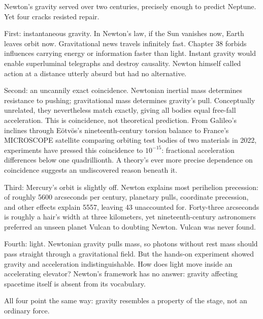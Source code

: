\begin{mainline}
Newton's gravity served over two centuries, precisely enough to predict Neptune. Yet four cracks resisted repair.

First: instantaneous gravity. In Newton's law, if the Sun vanishes now, Earth leaves orbit now. Gravitational news travels infinitely fast. Chapter 38 forbids influences carrying energy or information faster than light. Instant gravity would enable superluminal telegraphs and destroy causality. Newton himself called action at a distance utterly absurd but had no alternative.

Second: an uncannily exact coincidence. Newtonian inertial mass determines resistance to pushing; gravitational mass determines gravity's pull. Conceptually unrelated, they nevertheless match exactly, giving all bodies equal free-fall acceleration. This is coincidence, not theoretical prediction. From Galileo's inclines through Eötvös's nineteenth-century torsion balance to France's MICROSCOPE satellite comparing orbiting test bodies of two materials in 2022, experiments have pressed this coincidence to \(10^{-15}\): fractional acceleration differences below one quadrillionth. A theory's ever more precise dependence on coincidence suggests an undiscovered reason beneath it.

Third: Mercury's orbit is slightly off. Newton explains most perihelion precession: of roughly 5600 arcseconds per century, planetary pulls, coordinate precession, and other effects explain 5557, leaving 43 unaccounted for. Forty-three arcseconds is roughly a hair's width at three kilometers, yet nineteenth-century astronomers preferred an unseen planet Vulcan to doubting Newton. Vulcan was never found.

Fourth: light. Newtonian gravity pulls mass, so photons without rest mass should pass straight through a gravitational field. But the hands-on experiment showed gravity and acceleration indistinguishable. How does light move inside an accelerating elevator? Newton's framework has no answer: gravity affecting spacetime itself is absent from its vocabulary.

All four point the same way: gravity resembles a property of the stage, not an ordinary force.
\end{mainline}


